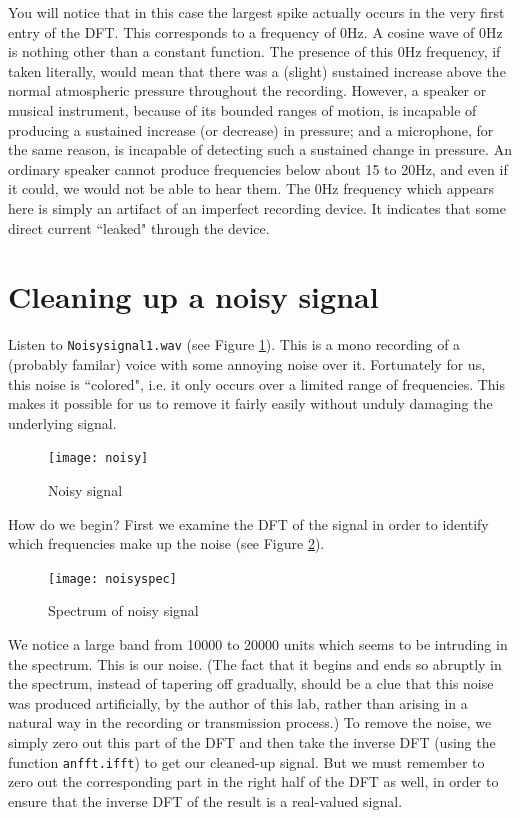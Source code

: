You will notice that in this case the largest spike actually occurs in the very first entry of the DFT. This corresponds to a frequency of 0Hz. A cosine wave of 0Hz is nothing other than a constant function. The presence of this 0Hz frequency, if taken literally, would mean that there was a (slight) sustained increase above the normal atmospheric pressure throughout the recording. However, a speaker or musical instrument, because of its bounded ranges of motion, is incapable of producing a sustained increase (or decrease) in pressure; and a microphone, for the same reason, is incapable of detecting such a sustained change in pressure. An ordinary speaker cannot produce frequencies below about 15 to 20Hz, and even if it could, we would not be able to hear them. The 0Hz frequency which appears here is simply an artifact of an imperfect recording device. It indicates that some direct current ``leaked" through the device.


\section*{Cleaning up a noisy signal}

Listen to \texttt{Noisysignal1.wav} (see Figure \ref{noisysignal}). This is a mono recording of a (probably familar) voice with some annoying noise over it. Fortunately for us, this noise is ``colored", i.e. it only occurs over a limited range of frequencies. This makes it possible for us to remove it fairly easily without unduly damaging the underlying signal.
\begin{figure}[ht]\caption{Noisy signal}\label{noisysignal}\centering\texttt{[image: noisy]}\end{figure}
How do we begin? First we examine the DFT of the signal in order to identify which frequencies make up the noise (see Figure \ref{noisyspec}).
\begin{figure}[ht]\caption{Spectrum of noisy signal}\label{noisyspec}\centering\texttt{[image: noisyspec]}\end{figure}
We notice a large band from 10000 to 20000 units which seems to be intruding in the spectrum. This is our noise. (The fact that it begins and ends so abruptly in the spectrum, instead of tapering off gradually, should be a clue that this noise was produced artificially, by the author of this lab, rather than arising in a natural way in the recording or transmission process.) To remove the noise, we simply zero out this part of the DFT and then take the inverse DFT (using the function \texttt{anfft.ifft}) to get our cleaned-up signal. But we must remember to zero out the corresponding part in the right half of the DFT as well, in order to ensure that the inverse DFT of the result is a real-valued signal.

